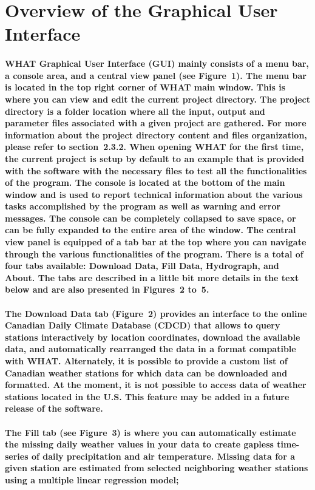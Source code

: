 \documentclass[10pt, letterpaper, fleqn]{report}
\begin{document}
\section{Overview of the Graphical User Interface}

\paragraph{WHAT Graphical User Interface (GUI) mainly consists of a menu bar, a console area, and a central view panel (see Figure 1). The menu bar is located in the top right corner of WHAT main window. This is where you can view and edit the current project directory. The project directory is a folder location where all the input, output and parameter files associated with a given project are gathered. For more information about the project directory content and files organization, please refer to section 2.3.2. When opening WHAT for the first time, the current project is setup by default to an example that is provided with the software with the necessary files to test all the functionalities of the program. The console is located at the bottom of the main window and is used to report technical information about the various tasks accomplished by the program as well as warning and error messages. The console can be completely collapsed to save space, or can be fully expanded to the entire area of the window. The central view panel is equipped of a tab bar at the top where you can navigate through the various functionalities of the program. There is a total of four tabs available: Download Data, Fill Data, Hydrograph, and About. The tabs are described in a little bit more details in the text below and are also presented in Figures 2 to 5.}
\paragraph{The Download Data tab (Figure 2) provides an interface to the online Canadian Daily Climate Database (CDCD) that allows to query stations interactively by location coordinates, download the available data, and automatically rearranged the data in a format compatible with WHAT. Alternately, it is possible to provide a custom list of Canadian weather stations for which data can be downloaded and formatted. At the moment, it is not possible to access data of weather stations located in the U.S. This feature may be added in a future release of the software.}
\paragraph{The Fill tab (see Figure 3) is where you can automatically estimate the missing daily weather values in your data to create gapless time-series of daily precipitation and air temperature. Missing data for a given station are estimated from selected neighboring weather stations using a multiple linear regression model;}
\end{document}
